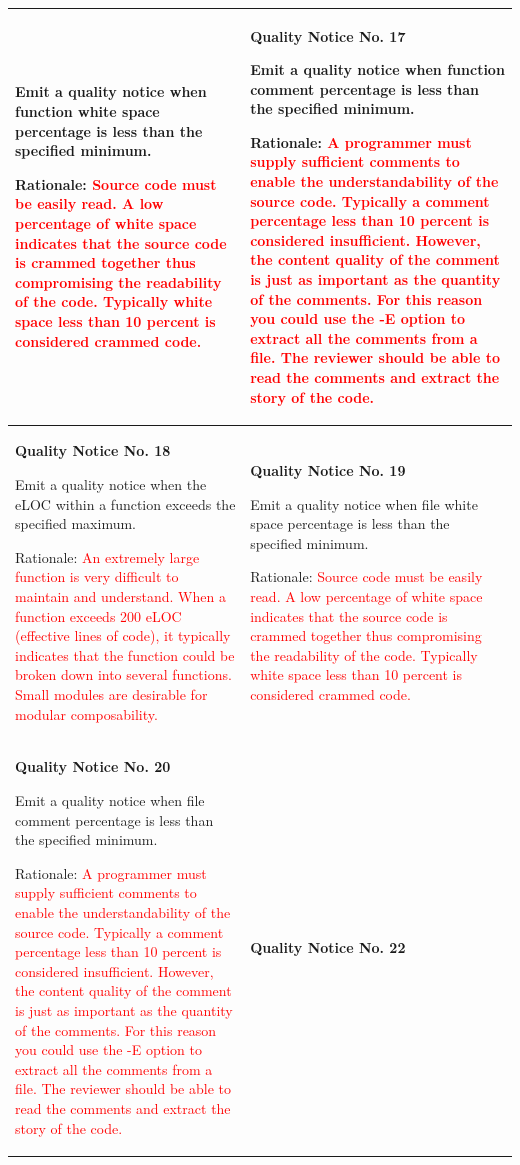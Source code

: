 {\begin{longtable}{||p{}|p{}||}
Emit a quality notice when function white space
percentage is less than the specified minimum.

Rationale:  \textcolor{red}{Source code must be easily read.  A low percentage of white space indicates that the source code is crammed together thus compromising the readability of the code.  Typically white space less than 10 percent is considered crammed  code. }
 & \textbf{Quality Notice No. 17}
 
Emit a quality notice when function comment
percentage is less than the specified minimum.

Rationale:  \textcolor{red}{A programmer must supply sufficient comments to enable the understandability of the source code.  Typically a comment percentage less than 10 percent is considered insufficient.  However, the content quality of the comment is just as important as the quantity of the comments.  For this reason you could use the -E option to extract all the comments from a file.  The reviewer should be able to read the comments and extract the story of the code.}
    \\
    \hline \textbf{Quality Notice No. 18}
    
Emit a quality notice when the eLOC within a
function exceeds the specified maximum.

Rationale:  \textcolor{red}{An extremely large function is very difficult to maintain and understand.  When a function exceeds 200 eLOC (effective lines of code), it typically indicates that the function could be broken down into several functions.  Small modules are desirable for modular composability.}
 & \textbf{Quality Notice No. 19}
 
Emit a quality notice when file white space
percentage is less than the specified minimum.

Rationale:  \textcolor{red}{Source code must be easily read.  A low percentage of white space indicates that the source code is crammed together thus compromising the readability of the code.  Typically white space less than 10 percent is considered crammed  code.}

    \\
    \hline \textbf{Quality Notice No. 20}
    
Emit a quality notice when file comment
percentage is less than the specified minimum.

Rationale:  \textcolor{red}{A programmer must supply sufficient comments to enable the understandability of the source code.  Typically a comment percentage less than 10 percent is considered insufficient.  However, the content quality of the comment is just as important as the quantity of the comments.  For this reason you could use the -E option to extract all the comments from a file.  The reviewer should be able to read the comments and extract the story of the code.}
 & \textbf{Quality Notice No. 22}
 

\end{longtable}}
